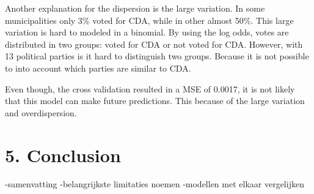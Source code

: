 \documentclass[11pt,]{article}
\begin{document}
Another explanation for the dispersion is the large variation. In some
municipalities only 3\% voted for CDA, while in other almost 50\%. This
large variation is hard to modeled in a binomial. By using the log odds,
votes are distributed in two groups: voted for CDA or not voted for CDA.
However, with 13 political parties is it hard to distinguish two groups.
Because it is not possible to into account which parties are similar to
CDA.

Even though, the cross validation resulted in a MSE of 0.0017, it is not
likely that this model can make future predictions. This because of the
large variation and overdispersion.

\section{5. Conclusion}\label{conclusion}

-samenvatting -belangrijkste limitaties noemen -modellen met elkaar
vergelijken
\end{document}
